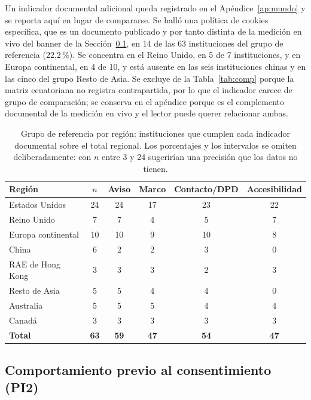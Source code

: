 \documentclass[pdflatex,sn-basic,Numbered,iicol]{sn-jnl}
\theoremstyle{thmstyleone}
\theoremstyle{thmstyletwo}
\theoremstyle{thmstylethree}
\begin{document}
Un indicador documental adicional queda registrado en el Ap\'endice~\ref{ap:mundo} y se reporta aqu\'i en lugar de compararse. Se hall\'o una pol\'itica de cookies espec\'ifica, que es un documento publicado y por tanto distinta de la medici\'on en vivo del banner de la Secci\'on~\ref{sec:results-cookies}, en 14 de las 63 instituciones del grupo de referencia (22,2\,\%). Se concentra en el Reino Unido, en 5 de 7 instituciones, y en Europa continental, en 4 de 10, y est\'a ausente en las seis instituciones chinas y en las cinco del grupo Resto de Asia. Se excluye de la Tabla~\ref{tab:comp} porque la matriz ecuatoriana no registra contrapartida, por lo que el indicador carece de grupo de comparaci\'on; se conserva en el ap\'endice porque es el complemento documental de la medici\'on en vivo y el lector puede querer relacionar ambas.

\begin{table}[htbp]
	\centering
	\caption{Grupo de referencia por regi\'on: instituciones que cumplen cada indicador documental sobre el total regional. Los porcentajes y los intervalos se omiten deliberadamente: con $n$ entre 3 y 24 sugerir\'ian una precisi\'on que los datos no tienen.}\label{tab:reg}
	\small
	\begin{tabular}{@{}lccccc@{}}
		\toprule
		\textbf{Regi\'on} & \textbf{$n$} & \textbf{Aviso} & \textbf{Marco} & \textbf{Contacto/DPD} & \textbf{Accesibilidad} \\
		\midrule
		Estados Unidos & 24 & 24 & 17 & 23 & 22 \\
		Reino Unido & 7 & 7 & 4 & 5 & 7 \\
		Europa continental & 10 & 10 & 9 & 10 & 8 \\
		China & 6 & 2 & 2 & 3 & 0 \\
		RAE de Hong Kong & 3 & 3 & 3 & 2 & 3 \\
		Resto de Asia & 5 & 5 & 4 & 4 & 0 \\
		Australia & 5 & 5 & 5 & 4 & 4 \\
		Canad\'a & 3 & 3 & 3 & 3 & 3 \\
		\midrule
		\textbf{Total} & \textbf{63} & \textbf{59} & \textbf{47} & \textbf{54} & \textbf{47} \\
		\bottomrule
	\end{tabular}
\end{table}

\subsection{Comportamiento previo al consentimiento (PI2)}\label{sec:results-cookies}
\end{document}
